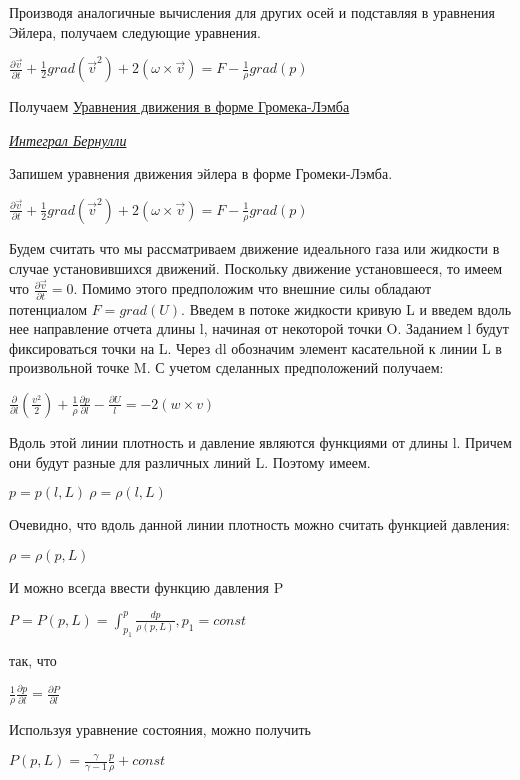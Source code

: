 Производя аналогичные вычисления для других осей и подставляя в уравнения Эйлера, получаем следующие уравнения.
\begin{center}
  $\frac{\partial \vec{v}}{\partial t} + \frac{1}{2}grad(\vec{v}^2) + 2(\omega\times \vec{v}) = F - \frac{1}{\rho}grad(p)$
\end{center}
Получаем \underline{Уравнения движения в форме Громека-Лэмба}
\begin{center}
  \textit{\underline{Интеграл Бернулли}}
\end{center}
Запишем уравнения движения эйлера в форме Громеки-Лэмба.
\begin{center}
  $\frac{\partial \vec{v}}{\partial t} + \frac{1}{2}grad(\vec{v}^2) + 2(\omega\times \vec{v}) = F - \frac{1}{\rho}grad(p)$
\end{center}
Будем считать что мы рассматриваем движение идеального газа или жидкости в случае установившихся движений. Поскольку движение установшееся, то имеем что $\frac{\partial \vec{v}}{\partial t} = 0$. Помимо этого предположим что внешние силы обладают потенциалом $F = grad(U)$.
Введем в потоке жидкости кривую L и введем вдоль нее направление отчета длины l, начиная от некоторой точки O. Заданием l будут фиксироваться точки на L. Через dl обозначим элемент касательной к линии L в произвольной точке M. С учетом сделанных предположений получаем:
\begin{center}
  $\frac{\partial}{\partial l}\left(\frac{v^2}{2}\right) + \frac{1}{\rho} \frac{\partial p}{\partial l} - \frac{\partial U}{l} = -2(w\times v)$
\end{center}
Вдоль этой линии плотность и давление являются функциями от длины l. Причем они будут разные для различных линий L. Поэтому имеем.
\begin{center}
  $p = p(l,L) \ \rho = \rho(l,L)$
\end{center}
Очевидно, что вдоль данной линии плотность можно считать функцией давления:
\begin{center}
  $\rho = \rho(p,L)$
\end{center}
И можно всегда ввести функцию давления P
\begin{center}
  $P = P(p,L) = \int_{p_1}^p\frac{dp}{\rho(p,L)}, p_1 = const$
\end{center}
так, что
\begin{center}
  $\frac{1}{\rho}\frac{\partial p}{\partial l} = \frac{\partial P}{\partial l}$
\end{center}
Используя уравнение состояния, можно получить
\begin{center}
  $P(p,L) = \frac{\gamma}{\gamma - 1}\frac{p}{\rho} + const$
\end{center}

